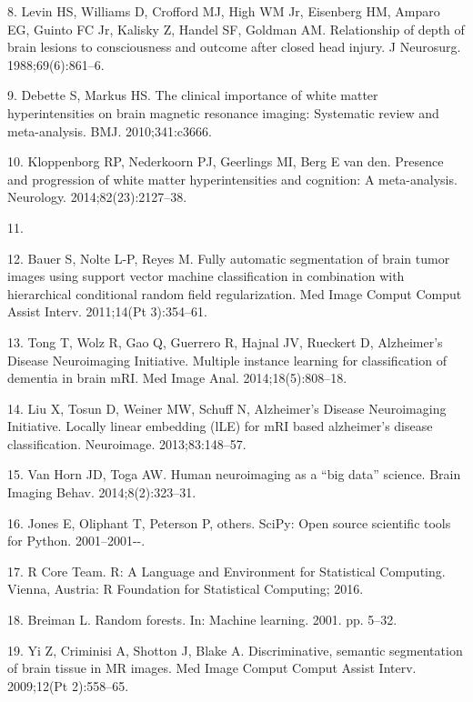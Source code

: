 \documentclass[11pt,]{article}
\begin{document}
\hypertarget{ref-Levin:1988aa}{}
8. Levin HS, Williams D, Crofford MJ, High WM Jr, Eisenberg HM, Amparo
EG, Guinto FC Jr, Kalisky Z, Handel SF, Goldman AM. Relationship of
depth of brain lesions to consciousness and outcome after closed head
injury. J Neurosurg. 1988;69(6):861--6.

\hypertarget{ref-Debette:2010aa}{}
9. Debette S, Markus HS. The clinical importance of white matter
hyperintensities on brain magnetic resonance imaging: Systematic review
and meta-analysis. BMJ. 2010;341:c3666.

\hypertarget{ref-Kloppenborg:2014aa}{}
10. Kloppenborg RP, Nederkoorn PJ, Geerlings MI, Berg E van den.
Presence and progression of white matter hyperintensities and cognition:
A meta-analysis. Neurology. 2014;82(23):2127--38.

\hypertarget{ref-mlmi2015}{}
11.

\hypertarget{ref-Bauer:2011aa}{}
12. Bauer S, Nolte L-P, Reyes M. Fully automatic segmentation of brain
tumor images using support vector machine classification in combination
with hierarchical conditional random field regularization. Med Image
Comput Comput Assist Interv. 2011;14(Pt 3):354--61.

\hypertarget{ref-Tong:2014aa}{}
13. Tong T, Wolz R, Gao Q, Guerrero R, Hajnal JV, Rueckert D,
Alzheimer's Disease Neuroimaging Initiative. Multiple instance learning
for classification of dementia in brain mRI. Med Image Anal.
2014;18(5):808--18.

\hypertarget{ref-Liu:2013aa}{}
14. Liu X, Tosun D, Weiner MW, Schuff N, Alzheimer's Disease
Neuroimaging Initiative. Locally linear embedding (lLE) for mRI based
alzheimer's disease classification. Neuroimage. 2013;83:148--57.

\hypertarget{ref-Van-Horn:2014aa}{}
15. Van Horn JD, Toga AW. Human neuroimaging as a ``big data'' science.
Brain Imaging Behav. 2014;8(2):323--31.

\hypertarget{ref-scipy}{}
16. Jones E, Oliphant T, Peterson P, others. SciPy: Open source
scientific tools for Python. 2001--2001-\/-.

\hypertarget{ref-R}{}
17. R Core Team. R: A Language and Environment for Statistical
Computing. Vienna, Austria: R Foundation for Statistical Computing;
2016.

\hypertarget{ref-breiman2001}{}
18. Breiman L. Random forests. In: Machine learning. 2001. pp. 5--32.

\hypertarget{ref-yi2009}{}
19. Yi Z, Criminisi A, Shotton J, Blake A. Discriminative, semantic
segmentation of brain tissue in MR images. Med Image Comput Comput
Assist Interv. 2009;12(Pt 2):558--65.
\end{document}
